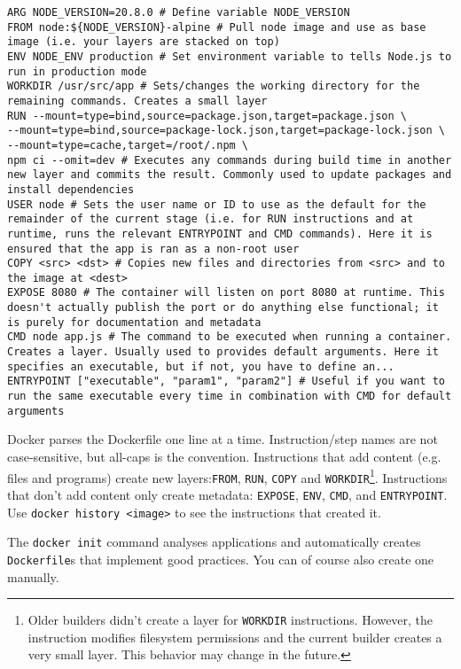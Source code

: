 \documentclass[8pt, table, xcdraw]{article}%
\begin{document}
\begin{lstlisting}
ARG NODE_VERSION=20.8.0 # Define variable NODE_VERSION
FROM node:${NODE_VERSION}-alpine # Pull node image and use as base image (i.e. your layers are stacked on top)
ENV NODE_ENV production # Set environment variable to tells Node.js to run in production mode
WORKDIR /usr/src/app # Sets/changes the working directory for the remaining commands. Creates a small layer
RUN --mount=type=bind,source=package.json,target=package.json \
--mount=type=bind,source=package-lock.json,target=package-lock.json \
--mount=type=cache,target=/root/.npm \
npm ci --omit=dev # Executes any commands during build time in another new layer and commits the result. Commonly used to update packages and install dependencies
USER node # Sets the user name or ID to use as the default for the remainder of the current stage (i.e. for RUN instructions and at runtime, runs the relevant ENTRYPOINT and CMD commands). Here it is ensured that the app is ran as a non-root user
COPY <src> <dst> # Copies new files and directories from <src> and to the image at <dest>
EXPOSE 8080 # The container will listen on port 8080 at runtime. This doesn't actually publish the port or do anything else functional; it is purely for documentation and metadata
CMD node app.js # The command to be executed when running a container. Creates a layer. Usually used to provides default arguments. Here it specifies an executable, but if not, you have to define an...
ENTRYPOINT ["executable", "param1", "param2"] # Useful if you want to run the same executable every time in combination with CMD for default arguments
\end{lstlisting}

Docker parses the Dockerfile one line at a time. Instruction/step names are not case-sensitive, but all-caps is the convention. Instructions that add content (e.g. files and programs) create new layers:\lstinline{FROM}, \lstinline{RUN}, \lstinline{COPY} and \lstinline{WORKDIR}\footnote{Older builders didn’t create a layer for \lstinline{WORKDIR} instructions. However, the instruction modifies filesystem permissions and the current builder creates a very small layer. This behavior may change in the future.}. Instructions that don’t add content only create metadata: \lstinline{EXPOSE}, \lstinline{ENV}, \lstinline{CMD}, and \lstinline{ENTRYPOINT}. Use \lstinline{docker history <image>} to see the instructions that created it. 

The \lstinline{docker init} command analyses applications and automatically creates \lstinline{Dockerfile}s that implement good practices. You can of course also create one manually.
\end{document}
